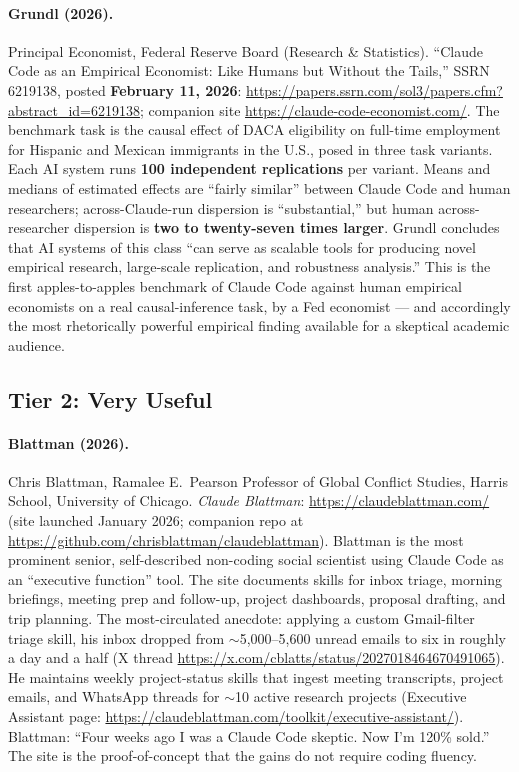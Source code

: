 \documentclass[11pt]{article}
\begin{document}
\paragraph{Grundl (2026).} Principal Economist, Federal Reserve Board (Research \& Statistics). ``Claude Code as an Empirical Economist: Like Humans but Without the Tails,'' SSRN 6219138, posted \textbf{February 11, 2026}: \url{https://papers.ssrn.com/sol3/papers.cfm?abstract_id=6219138}; companion site \url{https://claude-code-economist.com/}. The benchmark task is the causal effect of DACA eligibility on full-time employment for Hispanic and Mexican immigrants in the U.S., posed in three task variants. Each AI system runs \textbf{100 independent replications} per variant. Means and medians of estimated effects are ``fairly similar'' between Claude Code and human researchers; across-Claude-run dispersion is ``substantial,'' but human across-researcher dispersion is \textbf{two to twenty-seven times larger}. Grundl concludes that AI systems of this class ``can serve as scalable tools for producing novel empirical research, large-scale replication, and robustness analysis.'' This is the first apples-to-apples benchmark of Claude Code against human empirical economists on a real causal-inference task, by a Fed economist --- and accordingly the most rhetorically powerful empirical finding available for a skeptical academic audience.

\subsection{Tier 2: Very Useful}

\paragraph{Blattman (2026).} Chris Blattman, Ramalee E.\ Pearson Professor of Global Conflict Studies, Harris School, University of Chicago. \emph{Claude Blattman}: \url{https://claudeblattman.com/} (site launched January 2026; companion repo at \url{https://github.com/chrisblattman/claudeblattman}). Blattman is the most prominent senior, self-described non-coding social scientist using Claude Code as an ``executive function'' tool. The site documents skills for inbox triage, morning briefings, meeting prep and follow-up, project dashboards, proposal drafting, and trip planning. The most-circulated anecdote: applying a custom Gmail-filter triage skill, his inbox dropped from $\sim$5{,}000--5{,}600 unread emails to six in roughly a day and a half (X thread \url{https://x.com/cblatts/status/2027018464670491065}). He maintains weekly project-status skills that ingest meeting transcripts, project emails, and WhatsApp threads for $\sim$10 active research projects (Executive Assistant page: \url{https://claudeblattman.com/toolkit/executive-assistant/}). Blattman: ``Four weeks ago I was a Claude Code skeptic. Now I'm 120\% sold.'' The site is the proof-of-concept that the gains do not require coding fluency.
\end{document}
